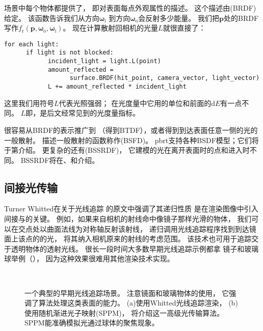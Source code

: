 场景中每个物体都提供了，
即对表面每点外观属性的描述。
这个描述由(BRDF)给定。
该函数告诉我们从方向${\bm \omega}_\mathrm{i}$
到方向${\bm \omega}_\mathrm{o}$会反射多少能量。
我们把$\bm p$处的BRDF写作$f_{\mathrm{r}}({\bm p},{\bm \omega}_\mathrm{o},{\bm \omega}_\mathrm{i})$。
现在计算散射回相机的光量$L$就很直接了：
\begin{lstlisting}
for each light:
      if light is not blocked:
            incident_light = light.L(point)
            amount_reflected =
                  surface.BRDF(hit_point, camera_vector, light_vector)
            L += amount_reflected * incident_light
\end{lstlisting}
这里我们用符号$L$代表光照强弱；
在光度量中它用的单位和前面的$\mathrm{d}E$有一点不同。
$L$即，是后文经常见到的光度量指标。

很容易从BRDF的表示推广到
（得到BTDF），或者得到到达表面任意一侧的光的一般散射。
描述一般散射的函数称作(BSFD)。
pbrt支持各种BSDF模型；它们将于第介绍。
更复杂的还有(BSSRDF)，
它建模的光在离开表面时的点和进入时不同。
BSSRDF将在、和介绍。

\subsection{间接光传输}\label{sub:间接光传输}

Turner Whitted在关于光线追踪
的原文中\citep{10.1145/358876.358882}强调了其递归性质
是在渲染图像中引入间接与的关键。
例如，如果来自相机的射线命中像镜子那样光滑的物体，
我们可以在交点处以曲面法线为对称轴反射该射线，
递归调用光线追踪程序找到到达镜面上该点的的光，
将其纳入相机原来的射线的考虑范围。
该技术也可用于追踪交于透明物体的透射光线。
很长一段时间大多数早期光线追踪示例都拿
镜子和玻璃球举例（），
因为这种效果很难用其他渲染技术实现。
\begin{figure}[htbp]
      \centering
      \\
      \caption{一个典型的早期光线追踪场景。
            注意镜面和玻璃物体的使用，
            它强调了算法处理这类表面的能力。
            (a)使用Whitted光线追踪渲染，
            (b)使用随机渐进光子映射(SPPM)，
            将介绍这一高级光传输算法。
            SPPM能准确模拟光通过球体的聚焦现象。}\label{fig:1.7}
\end{figure}

